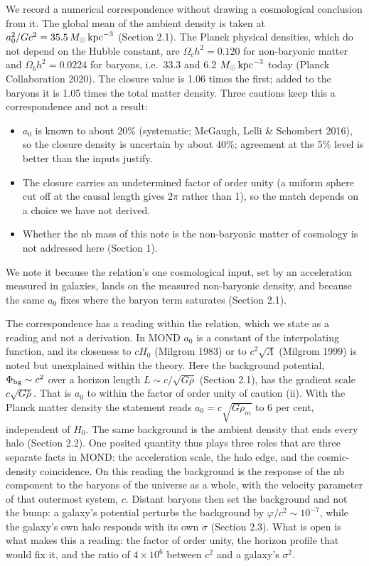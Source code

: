 \documentclass[
  10pt,
]{article}
\begin{document}
We record a numerical correspondence without drawing a cosmological
conclusion from it. The global mean of the ambient density is taken at
$a_0^2/Gc^2=35.5\,M_\odot\,{\rm kpc}^{-3}$ (Section 2.1). The Planck
physical densities, which do not depend on the Hubble constant, are
$\Omega_ch^2=0.120$ for non-baryonic matter and $\Omega_bh^2=0.0224$ for
baryons, i.e.\ 33.3 and 6.2 $M_\odot\,{\rm kpc}^{-3}$ today (Planck
Collaboration 2020). The closure value is 1.06 times the first; added to
the baryons it is 1.05 times the total matter density. Three cautions keep
this a correspondence and not a result:
\begin{itemize}
\item[(i)] $a_0$ is known to about 20\% (systematic; McGaugh, Lelli \& Schombert 2016), so the closure density is uncertain by about 40\%; agreement at the 5\% level is better than the inputs justify.
\item[(ii)] The closure carries an undetermined factor of order unity (a uniform sphere cut off at the causal length gives $2\pi$ rather than 1), so the match depends on a choice we have not derived.
\item[(iii)] Whether the nb mass of this note is the non-baryonic matter of cosmology is not addressed here (Section 1).
\end{itemize}
We note it because the relation's one cosmological input, set by an acceleration measured in galaxies, lands on the measured non-baryonic density, and because the same $a_0$ fixes where the baryon term saturates (Section 2.1).

The correspondence has a reading within the relation, which we state as a reading and not a derivation. In MOND $a_0$ is a constant of the interpolating function, and its closeness to $cH_0$ (Milgrom 1983) or to $c^2\sqrt{\Lambda}$ (Milgrom 1999) is noted but unexplained within the theory. Here the background potential, $\Phi_{\rm bg}\sim c^2$ over a horizon length $L\sim c/\sqrt{G\bar\rho}$ (Section 2.1), has the gradient scale $c\sqrt{G\bar\rho}$. That is $a_0$ to within the factor of order unity of caution (ii). With the Planck matter density the statement reads $a_0=c\sqrt{G\rho_m}$ to 6 per cent, independent of $H_0$. The same background is the ambient density that ends every halo (Section 2.2). One posited quantity thus plays three roles that are three separate facts in MOND: the acceleration scale, the halo edge, and the cosmic-density coincidence. On this reading the background is the response of the nb component to the baryons of the universe as a whole, with the velocity parameter of that outermost system, $c$. Distant baryons then set the background and not the bump: a galaxy's potential perturbs the background by $\varphi/c^2\sim10^{-7}$, while the galaxy's own halo responds with its own $\sigma$ (Section 2.3). What is open is what makes this a reading: the factor of order unity, the horizon profile that would fix it, and the ratio of $4\times10^6$ between $c^2$ and a galaxy's $\sigma^2$.
\end{document}

